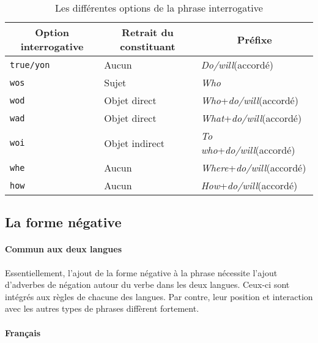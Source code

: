 \documentclass[11pt]{article} %
\newcommand{\real}[1]{\emph{#1}}
\begin{document}
\begin{table}[ht]
\centering
\caption{Les différentes options de la phrase interrogative}
\begin{tabular}{|l|l|l|}
\hline 
\multicolumn{1}{|c}{Option interrogative} & \multicolumn{1}{|c}{Retrait du constituant} & \multicolumn{1}{|c|}{Préfixe}\\
\hline 
\hline 
\texttt{true/yon} & Aucun & \real{Do/will}(accordé)\\
\hline 
\texttt{wos} & Sujet & \real{Who}\\
\hline 
\texttt{wod} & Objet direct & \real{Who}+\real{do/will}(accordé)\\
\hline 
\texttt{wad} & Objet direct & \real{What}+\real{do/will}(accordé)\\
\hline 
\texttt{woi} & Objet indirect & \real{To who}+\real{do/will}(accordé)\\
\hline 
\texttt{whe} & Aucun & \real{Where}+\real{do/will}(accordé)\\
\hline 
\texttt{how} & Aucun & \real{How}+\real{do/will}(accordé)\\
\hline 
\end{tabular}
\label{interroOptionsEn}
\end{table}

\subsection{La forme négative}

\paragraph{Commun aux deux langues}

Essentiellement, l'ajout de la forme négative à la phrase nécessite
l'ajout d'adverbes de négation autour du verbe dans les deux langues.
Ceux-ci sont
intégrés aux règles de chacune des langues. Par contre, leur position 
et interaction avec les autres types de phrases diffèrent fortement.

\paragraph{Français}
\end{document}
